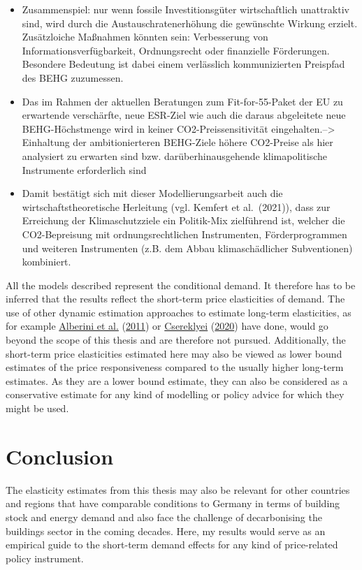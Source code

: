 \documentclass[12pt,twoside]{reedthesis}
\begin{document}
\begin{itemize}
\item
  Zusammenspiel: nur wenn fossile Investitionsgüter wirtschaftlich unattraktiv sind, wird durch die Austauschratenerhöhung die gewünschte Wirkung erzielt. Zusätzloiche Maßnahmen könnten sein: Verbesserung von Informationsverfügbarkeit, Ordnungsrecht oder finanzielle Förderungen. Besondere Bedeutung ist dabei einem verlässlich kommunizierten Preispfad des BEHG zuzumessen.
\item
  Das im Rahmen der aktuellen Beratungen zum Fit-for-55-Paket der EU zu erwartende verschärfte, neue ESR-Ziel wie auch die daraus abgeleitete neue BEHG-Höchstmenge wird in keiner CO2-Preissensitivität eingehalten.--\textgreater{} Einhaltung der ambitionierteren BEHG-Ziele höhere CO2-Preise als hier analysiert zu erwarten sind bzw. darüberhinausgehende klimapolitische Instrumente erforderlich sind
\item
  Damit bestätigt sich mit dieser Modellierungsarbeit auch die wirtschaftstheoretische Herleitung (vgl. Kemfert et al.~(2021)), dass zur Erreichung der Klimaschutzziele ein Politik-Mix zielführend ist, welcher die CO2-Bepreisung mit ordnungsrechtlichen Instrumenten, Förderprogrammen und weiteren Instrumenten (z.B. dem Abbau klimaschädlicher Subventionen) kombiniert.
\end{itemize}
All the models described represent the conditional demand. It therefore has to be inferred that the results reflect the short-term price elasticities of demand. The use of other dynamic estimation approaches to estimate long-term elasticities, as for example \protect\hyperlink{ref-alberini_etal11}{Alberini et al.} (\protect\hyperlink{ref-alberini_etal11}{2011}) or \protect\hyperlink{ref-csereklyei20}{Csereklyei} (\protect\hyperlink{ref-csereklyei20}{2020}) have done, would go beyond the scope of this thesis and are therefore not pursued. Additionally, the short-term price elasticities estimated here may also be viewed as lower bound estimates of the price responsiveness compared to the usually higher long-term estimates. As they are a lower bound estimate, they can also be considered as a conservative estimate for any kind of modelling or policy advice for which they might be used.

\hypertarget{conclusion}{%
\chapter{Conclusion}\label{conclusion}}

The elasticity estimates from this thesis may also be relevant for other countries and regions that have comparable conditions to Germany in terms of building stock and energy demand and also face the challenge of decarbonising the buildings sector in the coming decades. Here, my results would serve as an empirical guide to the short-term demand effects for any kind of price-related policy instrument.
\end{document}
